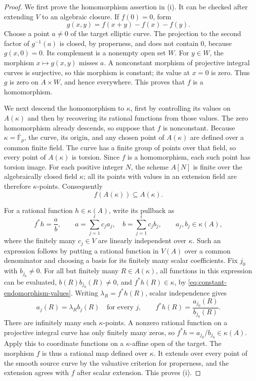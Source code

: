 \begin{proof}
We first prove the homomorphism assertion in (i).  It can be checked
after extending $V$ to an algebraic closure.  If $f(0)=0$, form
\[
            g(x,y)=f(x+y)-f(x)-f(y).
\]
Choose a point $a\ne0$ of the target elliptic curve.  The projection
to the second factor of $g^{-1}(a)$ is closed, by properness, and
does not contain $0$, because $g(x,0)=0$.  Its complement is a
nonempty open set $W$.  For $y\in W$, the morphism
$x\mapsto g(x,y)$ misses $a$.  A nonconstant morphism of projective
integral curves is surjective, so this morphism is constant; its value
at $x=0$ is zero.  Thus $g$ is zero on $A\times W$, and hence
everywhere.  This proves that $f$ is a homomorphism.

We next descend the homomorphism to $\kappa$, first by controlling its
values on $A(\kappa)$ and then by recovering its rational functions
from those values. The zero homomorphism already descends, so suppose
that $f$ is nonconstant. Because $\kappa=\overline{\mathbb F}_p$, the
curve, its origin, and any chosen point of $A(\kappa)$ are defined over
a common finite field. The curve has a finite group of points over
that field, so every point of $A(\kappa)$ is torsion. Since $f$ is a homomorphism, each
such point has torsion image. For each positive integer $N$, the scheme
$A[N]$ is finite over
the algebraically closed field $\kappa$; all its points with values
in an extension field are therefore $\kappa$-points.  Consequently
\begin{equation}\label{eq:constant-endomorphism-values}
                           f(A(\kappa))\subseteq A(\kappa).
\end{equation}

For a rational function $h\in\kappa(A)$, write its pullback as
\[
 f^*h=\frac{a}{b},\qquad
 a=\sum_{j=1}^t c_j a_j,\quad
 b=\sum_{j=1}^t c_j b_j,
 \qquad a_j,b_j\in\kappa(A),
\]
where the finitely many $c_j\in V$ are linearly independent over
$\kappa$.  Such an expression follows by putting a rational function
in $V(A)$ over a common denominator and choosing a basis for its
finitely many scalar coefficients.  Fix $j_0$ with $b_{j_0}\ne0$.
For all but finitely many $R\in A(\kappa)$, all functions in this
expression can be evaluated, $b(R)b_{j_0}(R)\ne0$, and
$f^*h(R)\in\kappa$, by \eqref{eq:constant-endomorphism-values}.
Writing $\lambda_R=f^*h(R)$, scalar independence gives
\[
       a_j(R)=\lambda_R b_j(R)\quad\text{for every }j,
       \qquad
       f^*h(R)=\frac{a_{j_0}(R)}{b_{j_0}(R)}.
\]
There are infinitely many such $\kappa$-points.  A nonzero rational
function on a projective integral curve has only finitely many zeros,
so $f^*h=a_{j_0}/b_{j_0}\in\kappa(A)$.
Apply this to coordinate functions on a $\kappa$-affine open of the
target.  The morphism $f$ is thus a rational map defined over $\kappa$.
It extends over every point of the smooth source curve by the
valuative criterion for properness, and the extension agrees with $f$
after scalar extension.  This proves (i).


\end{proof}
